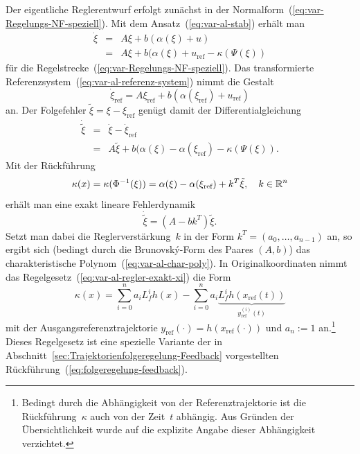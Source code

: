 Der eigentliche Reglerentwurf erfolgt zunächst in der Normalform~(\ref{eq:var-Regelungs-NF-speziell}).
Mit dem Ansatz~(\ref{eq:var-al-stab}) erhält man 
\[
\begin{array}{lcl}
\dot{\xi} & = & A\xi+b(\alpha(\xi)+u)\\
 & = & A\xi+b(\alpha(\xi)+u_{\text{ref}}-\kappa(\Psi(\xi))
\end{array}
\]
für die Regelstrecke~(\ref{eq:var-Regelungs-NF-speziell}). Das transformierte
Referenzsystem~(\ref{eq:var-al-referenz-system}) nimmt die Gestalt
\[
\dot{\xi}_{\text{ref}}=A\xi_{\text{ref}}+b\left(\alpha(\xi_{\text{ref}})+u_{\text{ref}}\right)
\]
an. Der Folgefehler $\tilde{\xi}=\xi-\xi_{\text{ref}}$ genügt damit
der Differentialgleichung
\begin{equation}
\begin{array}{lcl}
\dot{\tilde{\xi}} & = & \dot{\xi}-\dot{\xi}_{\text{ref}}\\
 & = & A\tilde{\xi}+b(\alpha(\xi)-\alpha(\xi_{\text{ref}})-\kappa(\Psi(\xi)).
\end{array}\label{eq:var-al-fehlerdyn1}
\end{equation}
Mit der Rückführung 
\begin{equation}
\kappa(x)=\kappa(\Phi^{-1}(\xi))=\alpha(\xi)-\alpha(\xi_{\text{ref}})+k^{T}\tilde{\xi},\quad k\in{\mathbb{R}}^{n}\label{eq:var-al-regler-exakt-xi}
\end{equation}
erhält man eine exakt lineare Fehlerdynamik
\begin{equation}
\dot{\tilde{\xi}}=\left(A-bk^{T}\right)\tilde{\xi}.\label{eq:var-al-fehlerdynamik-linear}
\end{equation}
Setzt man dabei die Reglerverstärkung~$k$ in der Form $k^{T}=\left(a_{0},\ldots,a_{n-1}\right)$
an, so ergibt sich (bedingt durch die Brunovský-Form des Paares $(A,b)$)
das charakteristische Polynom~(\ref{eq:var-al-char-poly}). In Originalkoordinaten
nimmt das Regelgesetz~(\ref{eq:var-al-regler-exakt-xi}) die Form
\begin{equation}
\kappa(x)=\sum_{i=0}^{n}a_{i}L_{f}^{i}h(x)-\sum_{i=0}^{n}a_{i}\underbrace{L_{f}^{i}h(x_{\text{ref}}(t))}_{{\displaystyle y_{\text{ref}}^{(i)}}(t)}\label{eq:var-al-regler-exakt}
\end{equation}
mit der Ausgangsreferenztrajektorie $y_{\text{ref}}(\cdot)=h(x_{\text{ref}}(\cdot))$
und $a_{n}:=1$ an.\footnote{Bedingt durch die Abhängigkeit von der Referenztrajektorie ist die
Rückführung~$\kappa$ auch von der Zeit~$t$ abhängig. Aus Gründen
der Übersichtlichkeit wurde auf die explizite Angabe dieser Abhängigkeit
verzichtet.} Dieses Regelgesetz ist eine spezielle Variante der in Abschnitt~\ref{sec:Trajektorienfolgeregelung-Feedback}
vorgestellten Rückführung~(\ref{eq:folgeregelung-feedback}).

